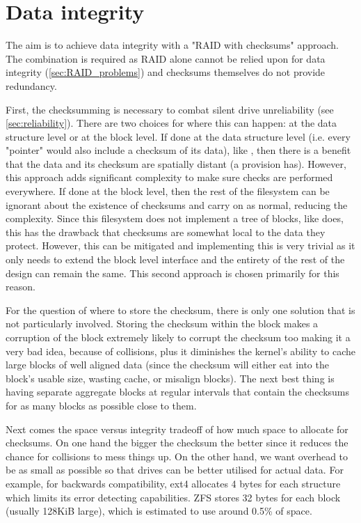     \section{Data integrity}
        \label{sec:data_integrity}

        The aim is to achieve data integrity with a "RAID with checksums"
        approach. The combination is required as RAID alone cannot be relied
        upon for data integrity (\autoref{sec:RAID_problems}) and checksums
        themselves do not provide redundancy.

        First, the checksumming is necessary to combat silent drive
        unreliability (see \autoref{sec:reliability}). There are two choices for
        where this can happen: at the data structure level or at the block
        level. If done at the data structure level (i.e. every "pointer" would
        also include a checksum of its data), like , then
        there is a benefit that the data and its checksum are spatially distant
        (a provision  has). However, this approach adds
        significant complexity to make sure checks are performed everywhere. If
        done at the block level, then the rest of the filesystem can be
        ignorant about the existence of checksums and carry on as normal,
        reducing the complexity. Since this filesystem does not implement a
        tree of blocks, like  does, this has the drawback
        that checksums are somewhat local to the data they protect. However, this can be mitigated and
        implementing this is very trivial as it only needs to extend the block
        level interface and the entirety of the rest of the design can remain
        the same. This second approach is chosen primarily for this reason.

        For the question of where to store the checksum, there is only one
        solution that is not particularly involved. Storing the checksum within
        the block makes a corruption of the block extremely likely to corrupt
        the checksum too making it a very bad idea, because of collisions, plus
        it diminishes the kernel's ability to cache large blocks of well
        aligned data (since the checksum will either eat into the block's
        usable size, wasting cache, or misalign blocks). The next best thing is
        having separate aggregate blocks at regular intervals that contain the checksums for as many
        blocks as possible close to them.

        Next comes the space versus integrity tradeoff of how much space to
        allocate for checksums. On one hand the bigger the checksum the better
        since it reduces the chance for collisions to mess things up. On the
        other hand, we want overhead to be as small as possible so that drives
        can be better utilised for actual data. For example, for backwards
        compatibility, ext4 allocates 4 bytes for each structure
        \cite{ext4_docs} which limits its error detecting capabilities. ZFS
        stores 32 bytes \cite{ZFS_docs} for each block (usually 128KiB large),
        which is estimated to use around 0.5\% \cite{ZFS_overhead} of space.

